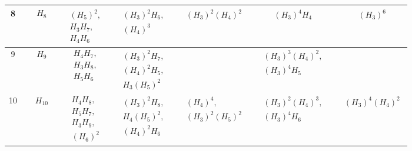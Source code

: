\begin{table}[H]
\begin{tabular}{ccccccc}
  \hline
  8 & $\begin{aligned}&H_{8}\end{aligned}$ & $\begin{aligned}&(H_{5})^2,\\&H_{3}H_{7},\\&H_{4}H_{6}\end{aligned}$ & $\begin{aligned}&(H_{3})^2H_{6},\\&(H_{4})^3\end{aligned}$ & $\begin{aligned}&(H_{3})^2(H_{4})^2\end{aligned}$ & $\begin{aligned}&(H_{3})^4H_{4}\end{aligned}$ & $\begin{aligned}&(H_{3})^6\end{aligned}$ \\
  \hline
  9 & $\begin{aligned}&H_{9}\end{aligned}$ & $\begin{aligned}&H_{4}H_{7},\\&H_{3}H_{8},\\&H_{5}H_{6}\end{aligned}$ & $\begin{aligned}&(H_{3})^2H_{7},\\&(H_{4})^2H_{5},\\&H_{3}(H_{5})^2\end{aligned}$ &  & $\begin{aligned}&(H_{3})^3(H_{4})^2,\\&(H_{3})^4H_{5}\end{aligned}$ &  \\
  \hline
  10 & $\begin{aligned}&H_{10}\end{aligned}$ & $\begin{aligned}&H_{4}H_{8},\\&H_{5}H_{7},\\&H_{3}H_{9},\\&(H_{6})^2\end{aligned}$ & $\begin{aligned}&(H_{3})^2H_{8},\\&H_{4}(H_{5})^2,\\&(H_{4})^2H_{6}\end{aligned}$ & $\begin{aligned}&(H_{4})^4,\\&(H_{3})^2(H_{5})^2\end{aligned}$ & $\begin{aligned}&(H_{3})^2(H_{4})^3,\\&(H_{3})^4H_{6}\end{aligned}$ & $\begin{aligned}&(H_{3})^4(H_{4})^2\end{aligned}$ \\

\end{tabular}
\end{table}
